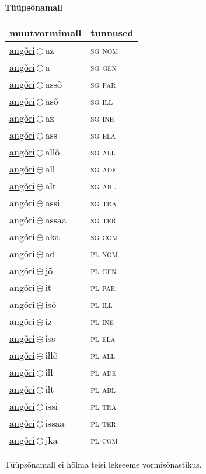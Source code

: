 

\vspace{3.5em}
\noindent \begin{minipage}{\textwidth}
\noindent \textbf{Tüüpsõnamall \,}\\

\begin{sideways}
\begin{tabular}{l l}
muutvormimall & tunnused \\
\hline
\underline{angõri}\,$\oplus$\,az & \textsc{ sg nom } \\
\underline{angõri}\,$\oplus$\,a & \textsc{ sg gen } \\
\underline{angõri}\,$\oplus$\,assõ & \textsc{ sg par } \\
\underline{angõri}\,$\oplus$\,asõ & \textsc{ sg ill } \\
\underline{angõri}\,$\oplus$\,az & \textsc{ sg ine } \\
\underline{angõri}\,$\oplus$\,ass & \textsc{ sg ela } \\
\underline{angõri}\,$\oplus$\,allõ & \textsc{ sg all } \\
\underline{angõri}\,$\oplus$\,all & \textsc{ sg ade } \\
\underline{angõri}\,$\oplus$\,alt & \textsc{ sg abl } \\
\underline{angõri}\,$\oplus$\,assi & \textsc{ sg tra } \\
\underline{angõri}\,$\oplus$\,assaa & \textsc{ sg ter } \\
\underline{angõri}\,$\oplus$\,aka & \textsc{ sg com } \\
\underline{angõri}\,$\oplus$\,ad & \textsc{ pl nom } \\
\underline{angõri}\,$\oplus$\,jõ & \textsc{ pl gen } \\
\underline{angõri}\,$\oplus$\,it & \textsc{ pl par } \\
\underline{angõri}\,$\oplus$\,isõ & \textsc{ pl ill } \\
\underline{angõri}\,$\oplus$\,iz & \textsc{ pl ine } \\
\underline{angõri}\,$\oplus$\,iss & \textsc{ pl ela } \\
\underline{angõri}\,$\oplus$\,illõ & \textsc{ pl all } \\
\underline{angõri}\,$\oplus$\,ill & \textsc{ pl ade } \\
\underline{angõri}\,$\oplus$\,ilt & \textsc{ pl abl } \\
\underline{angõri}\,$\oplus$\,issi & \textsc{ pl tra } \\
\underline{angõri}\,$\oplus$\,issaa & \textsc{ pl ter } \\
\underline{angõri}\,$\oplus$\,jka & \textsc{ pl com } \\
\end{tabular}
\end{sideways}
\label{tab:tüüpsõnamall-angõriaz}

\end{minipage}

 
\vspace{1em}
\noindent Tüüpsõnamall  ei hõlma teisi lekseeme vormi\-sõnastikus.

